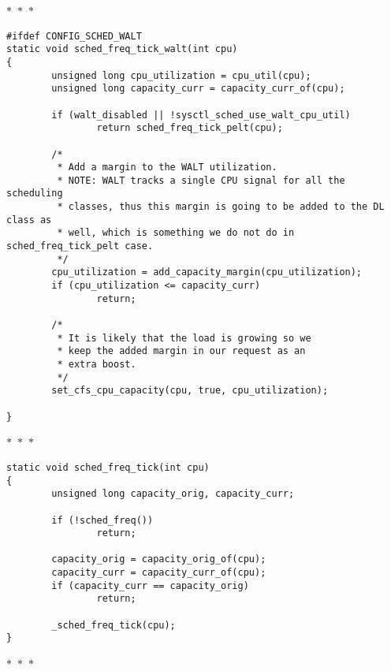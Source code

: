 \documentclass{article}
\newcommand{\divider}{{\begin{center}
  $\ast$~$\ast$~$\ast$
\end{center}}}
\begin{document}
\divider
\begin{verbatim}
#ifdef CONFIG_SCHED_WALT
static void sched_freq_tick_walt(int cpu)
{
        unsigned long cpu_utilization = cpu_util(cpu);
        unsigned long capacity_curr = capacity_curr_of(cpu);

        if (walt_disabled || !sysctl_sched_use_walt_cpu_util)
                return sched_freq_tick_pelt(cpu);

        /*
         * Add a margin to the WALT utilization.
         * NOTE: WALT tracks a single CPU signal for all the scheduling
         * classes, thus this margin is going to be added to the DL class as
         * well, which is something we do not do in sched_freq_tick_pelt case.
         */
        cpu_utilization = add_capacity_margin(cpu_utilization);
        if (cpu_utilization <= capacity_curr)
                return;

        /*
         * It is likely that the load is growing so we
         * keep the added margin in our request as an
         * extra boost.
         */
        set_cfs_cpu_capacity(cpu, true, cpu_utilization);

}
\end{verbatim}
\divider
\begin{verbatim}
static void sched_freq_tick(int cpu)
{
        unsigned long capacity_orig, capacity_curr;

        if (!sched_freq())
                return;

        capacity_orig = capacity_orig_of(cpu);
        capacity_curr = capacity_curr_of(cpu);
        if (capacity_curr == capacity_orig)
                return;

        _sched_freq_tick(cpu);
}
\end{verbatim}
\divider
\end{document}
